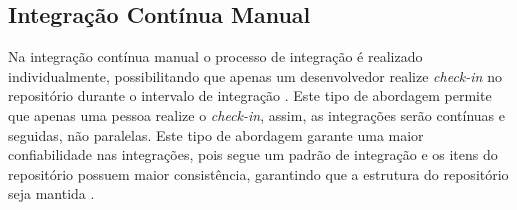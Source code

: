 
\subsection{Integração Contínua Manual}
Na integração contínua manual o processo de integração é realizado individualmente, possibilitando que apenas um desenvolvedor realize \textit{check-in} no repositório durante o intervalo de integração . Este tipo de abordagem permite que apenas uma pessoa realize o \textit{check-in}, assim, as integrações serão contínuas e seguidas, não paralelas. Este tipo de abordagem garante uma maior confiabilidade nas integrações, pois segue um padrão de integração e os itens do repositório possuem maior consistência, garantindo que a estrutura do repositório seja mantida \cite{gleiph2011}.

